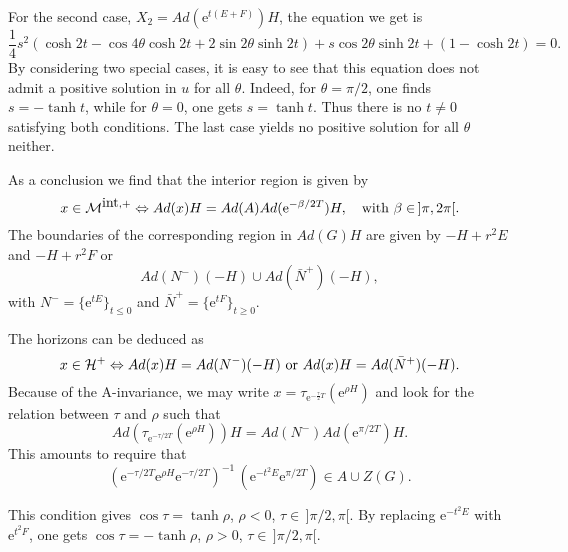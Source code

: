 For the second case, $X_2 =Ad(\mbox{e}^{t (E+F)})H$, the equation we get is
\begin{equation}
	\frac{1}{4} s^2 (\cosh 2t - \cos 4\theta \cosh 2t + 2 \sin
	2\theta \sinh 2t) + s \cos 2\theta \sinh 2t + (1 - \cosh 2t) = 0.
\end{equation}
By considering two special cases, it is easy to see that this equation does not admit a positive solution in $u$ for all $\theta$. Indeed, for $\theta = \pi/2$, one finds $s =-\tanh t$, while for $\theta = 0$, one gets $s=\tanh t$. Thus there is no $t\ne 0$ satisfying both conditions. The last case yields no positive solution for all $\theta$ neither.

As a conclusion we find that the interior region is given by
\begin{equation}
	x \in {\cal M}^{\mbox{int},+} \Leftrightarrow Ad(x)H =
	Ad(A)Ad(\mbox{e}^{-\beta/2 T})H, \quad \mbox{with} \,\,
	\beta \in \, ]\pi , 2\pi[.
\end{equation}
The boundaries of the corresponding region in $Ad(G)H$ are given by $-H + r^2 E$ and $-H + r^2 F$ or
\begin{equation}
	Ad(N^-)(-H) \cup  Ad(\bar{N}^+)(-H),
\end{equation}
with $N^- = \{\mbox{e}^{tE}\}_{t\leq 0}$ and $\bar{N}^+ = \{\mbox{e}^{tF}\}_{t\geq 0}$.

The horizons can be deduced as
\begin{equation}
	x \in {\cal H^+} \Leftrightarrow Ad(x)H = Ad(N^-)(-H) \,\,
	\mbox{or} \,\, Ad(x)H = Ad(\bar{N}^+)(-H).
\end{equation}
Because of the A-invariance, we may write $x=\tau_{\mbox{e}^{-\frac{\tau}{2} T}}(\mbox{e}^{\rho H})$ and look for the relation between $\tau$ and $\rho$ such that
\begin{equation}
	Ad(\tau_{\mbox{e}^{-\tau/2
			T}}(\mbox{e}^{\rho H}))H = Ad(N^-)Ad(\mbox{e}^{\pi/2 T}) H.
\end{equation}
This amounts to require that
\begin{equation}\label{CondHor}
	\left(\mbox{e}^{-\tau/2 T} \mbox{e}^{\rho H} \mbox{e}^{-\tau/2 T}\right)^{-1} \,
	(\mbox{e}^{-t^2 E} \mbox{e}^{\pi/2 T}) \in A \cup Z(G).
\end{equation}

This condition gives $\cos\tau = \tanh \rho$, $\rho<0$, $\tau\in \, ]\pi/2,\pi[$. By replacing $\mbox{e}^{-t^2 E}$ with $\mbox{e}^{t^2 F}$, one gets $\cos\tau = -\tanh \rho$, $\rho>0$, $\tau\in \, ]\pi/2,\pi[$.

